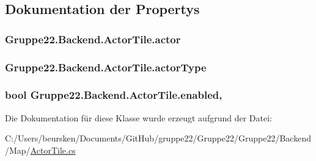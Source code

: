 \subsection{Dokumentation der Propertys}
\hypertarget{class_gruppe22_1_1_backend_1_1_actor_tile_a77ed5b0b9c6dd777a4a6242d4f3b5447}{
\subsubsection[{actor}]{ Gruppe22.\-Backend.\-Actor\-Tile.\-actor\hspace{0.3cm}{\ttfamily [get]}}}\label{class_gruppe22_1_1_backend_1_1_actor_tile_a77ed5b0b9c6dd777a4a6242d4f3b5447}
\hypertarget{class_gruppe22_1_1_backend_1_1_actor_tile_ab30c224f38c2e55d44d2cf65fe659f35}{
\subsubsection[{actor\-Type}]{ Gruppe22.\-Backend.\-Actor\-Tile.\-actor\-Type\hspace{0.3cm}{\ttfamily [get]}}}\label{class_gruppe22_1_1_backend_1_1_actor_tile_ab30c224f38c2e55d44d2cf65fe659f35}
\hypertarget{class_gruppe22_1_1_backend_1_1_actor_tile_af8631f09f32bba5be31d3603b3df99c6}{
\subsubsection[{enabled}]{\setlength{\rightskip}{0pt plus 5cm}bool Gruppe22.\-Backend.\-Actor\-Tile.\-enabled\hspace{0.3cm}{\ttfamily [get]}, {\ttfamily [set]}}}\label{class_gruppe22_1_1_backend_1_1_actor_tile_af8631f09f32bba5be31d3603b3df99c6}


Die Dokumentation für diese Klasse wurde erzeugt aufgrund der Datei\-:\begin{DoxyCompactItemize}
\item 
C\-:/\-Users/beursken/\-Documents/\-Git\-Hub/gruppe22/\-Gruppe22/\-Gruppe22/\-Backend/\-Map/\hyperlink{_actor_tile_8cs}{Actor\-Tile.\-cs}\end{DoxyCompactItemize}
